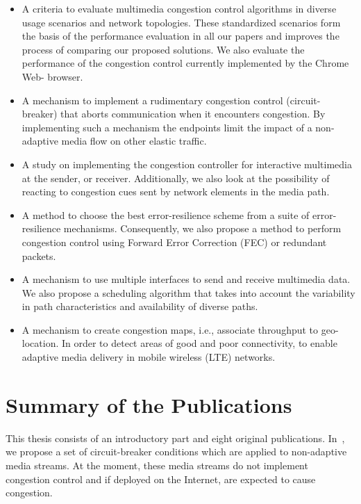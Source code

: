 \begin{itemize}
\setlength{\itemsep}{0pt}

\item A criteria to evaluate multimedia congestion control algorithms in
diverse usage scenarios and network topologies. These standardized scenarios
form the basis of the performance evaluation in all our papers and improves
the process of comparing our proposed solutions. We also evaluate the
performance of the congestion control currently implemented by the Chrome Web-
browser.

\item A mechanism to implement a rudimentary congestion control (circuit-
breaker) that aborts communication when it encounters congestion. By
implementing such a mechanism the endpoints limit the impact of a non-adaptive
media flow on other elastic traffic.

\item A study on implementing the congestion controller for interactive
multimedia at the sender, or receiver.  Additionally, we also look at the
possibility of reacting to congestion cues sent by network elements in the
media path.

\item A method to choose the best error-resilience scheme from a suite of
error-resilience mechanisms. Consequently, we also propose a method to perform
congestion control using Forward Error Correction (FEC) or redundant packets.

\item A mechanism to use multiple interfaces to send and receive multimedia
data. We also propose a scheduling algorithm that takes into account the
variability in path characteristics and availability of diverse paths. 

\item A mechanism to create congestion maps, i.e., associate throughput to 
geo-location. In order to detect areas of good and poor connectivity, to 
enable adaptive media delivery in mobile wireless (LTE) networks.
\end{itemize}

\section{Summary of the Publications}

This thesis consists of an introductory part and eight original publications.
In~, we propose a set of circuit-breaker conditions which are
applied to non-adaptive media streams. At the moment, these media streams do
not implement congestion control and if deployed on the Internet, are expected
to cause congestion.

